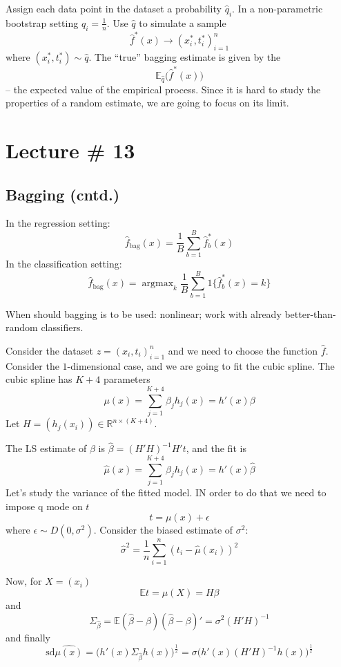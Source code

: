 \documentclass[a4paper]{article}
\newcommand{\Real}{\mathbb{R}}
\newcommand{\ex}{\mathbb{E}}
\newcommand{\argmax}{\mathop{\text{argmax}}}
\begin{document}

Assign each data point in the dataset a probability $\hat{q}_i$. In a non-parametric
bootstrap setting $\hat{q}_i = \frac{1}{n}$. Use $\hat{q}$ to simulate a sample
\[\hat{f}^*(x) \to (x^*_i, t^*_i)_{i=1}^n\]
where $(x^*_i, t^*_i)\sim \hat{q}$. The ``true'' bagging estimate is given by the 
\[\ex_{\hat{q}} \bigl(\hat{f}^*(x)\bigr)\]
-- the expected value of the empirical process. Since it is hard to study the
properties of a random estimate, we are going to focus on its limit.




\section{Lecture \# 13} %
\label{sec:lecture_13}

\subsection{Bagging (cntd.)} %
\label{sub:bagging_cntd}

In the regression setting:
\[ \hat{f}_{\text{bag}}(x) = \frac{1}{B} \sum_{b=1}^B \hat{f}^*_b(x) \]
In the classification setting:
\[ \hat{f}_{\text{bag}}(x) = \argmax_{k}\frac{1}{B} \sum_{b=1}^B 1\{\hat{f}^*_b(x)=k\} \]

When should bagging is to be used:
nonlinear;
work with already better-than-random classifiers.

Consider the dataset $z=(x_i,t_i)_{i=1}^n$ and we need to choose the function $\hat{f}$.
Consider the $1$-dimensional case, and we are going to fit the cubic spline.
The cubic spline has $K+4$ parameters
\[\mu(x) =\sum_{j=1}^{K+4} \beta_j h_j(x) = h'(x) \beta \]
Let $H = (h_j(x_i)) \in \Real^{n\times (K+4)}$.

The LS estimate of $\beta$ is $\hat{\beta} = (H'H)^{-1}H't$, and the fit is
\[ \hat{\mu}(x) = \sum_{j=1}^{K+4} \beta_j h_j(x) = h'(x) \hat{\beta} \]
Let's study the variance of the fitted model. IN order to do that we need to 
impose q mode on $t$
\[t = \mu(x) + \epsilon\]
where $\epsilon\sim D(0,\sigma^2)$. Consider the biased estimate of $\sigma^2$:
\[\hat{\sigma}^2 = \frac{1}{n}\sum_{i=1}^n (t_i-\hat{\mu}(x_i))^2\]

Now, for $X = (x_i)$
\[\ex t = \mu(X) = H\beta\]
and 
\[
\Sigma_{\hat{\beta}}
= \ex(\hat{\beta}-\beta)(\hat{\beta}-\beta)'
= \sigma^2 (H'H)^{-1}
\]
and finally
\[
\text{sd}\hat{\mu(x)}
= \bigl( h'(x) \Sigma_{\hat{\beta}} h(x) \bigr)^\frac{1}{2}
= \sigma \bigl( h'(x) (H'H)^{-1} h(x) \bigr)^\frac{1}{2}
\]
\end{document}
